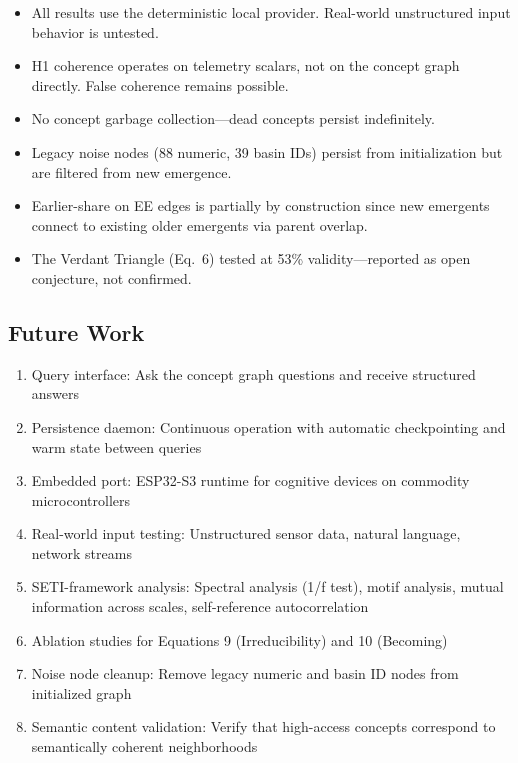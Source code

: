 \documentclass[11pt,a4paper]{article}
\begin{document}
\begin{itemize}[nosep]
    \item All results use the deterministic local provider. Real-world unstructured input behavior is untested.
    \item H1 coherence operates on telemetry scalars, not on the concept graph directly. False coherence remains possible.
    \item No concept garbage collection---dead concepts persist indefinitely.
    \item Legacy noise nodes (88 numeric, 39 basin IDs) persist from initialization but are filtered from new emergence.
    \item Earlier-share on EE edges is partially by construction since new emergents connect to existing older emergents via parent overlap.
    \item The Verdant Triangle (Eq.\ 6) tested at 53\% validity---reported as open conjecture, not confirmed.
\end{itemize}

\subsection{Future Work}

\begin{enumerate}[nosep]
    \item Query interface: Ask the concept graph questions and receive structured answers
    \item Persistence daemon: Continuous operation with automatic checkpointing and warm state between queries
    \item Embedded port: ESP32-S3 runtime for cognitive devices on commodity microcontrollers
    \item Real-world input testing: Unstructured sensor data, natural language, network streams
    \item SETI-framework analysis: Spectral analysis (1/f test), motif analysis, mutual information across scales, self-reference autocorrelation
    \item Ablation studies for Equations 9 (Irreducibility) and 10 (Becoming)
    \item Noise node cleanup: Remove legacy numeric and basin ID nodes from initialized graph
    \item Semantic content validation: Verify that high-access concepts correspond to semantically coherent neighborhoods
\end{enumerate}
\end{document}
